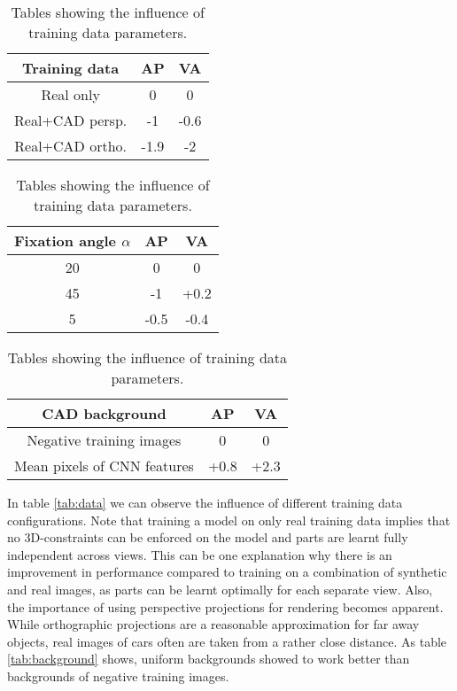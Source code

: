 \begin{table}[]
	\parbox{.45\linewidth}{
		\centering
		\begin{tabular}{|c|c|c|}
		\hline
		Training data & AP & VA\\
		\hline\hline
		 Real only & 0 & 0\\
		\hline 
		 Real+CAD persp. & -1 & -0.6 \\
		 \hline 
		 Real+CAD ortho. & -1.9 & -2\\
		 \hline
		\end{tabular}
		\label{tab:data}
	}		
	\parbox{.45\linewidth}{
		\centering
		\begin{tabular}{|c|c|c|}
		\hline
		Fixation angle $\alpha$ & AP & VA\\
		\hline\hline
		 20 & 0 & 0\\
		\hline 
		 45  & -1 & +0.2 \\
		 \hline 
		 5 & -0.5 & -0.4 \\
		 \hline
		\end{tabular}
		\label{tab:alpha}
	}	
	\parbox{\linewidth}{
		\centering
		\begin{tabular}{|c|c|c|}
		\hline
		CAD background& AP & VA\\
		\hline\hline
		 Negative training images & 0 & 0\\
		\hline 
		 Mean pixels of CNN features & +0.8 & +2.3 \\
		 \hline 
		\end{tabular}
		\label{tab:background}
	}
	\caption{Tables showing the influence of training data parameters.}
	\label{tab:dataParam}
\end{table}

In table \ref{tab:data} we can observe the influence of different training data configurations. Note that training a model on only real training data implies that no 3D-constraints can be enforced on the model and parts are learnt fully independent across views. This can be one explanation why there is an improvement in performance compared to training on a combination of synthetic and real images, as parts can be learnt optimally for each separate view. Also, the importance of using perspective projections for rendering becomes apparent. While orthographic projections are a reasonable approximation for far away objects, real images of cars often are taken from a rather close distance. As table \ref{tab:background} shows, uniform backgrounds showed to work better than backgrounds of negative training images.  

